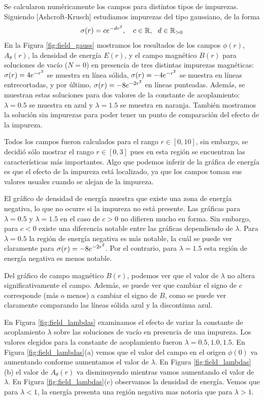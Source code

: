 Se calcularon numéricamente los campos para distintos tipos de impurezas. Siguiendo [Ashcroft-Krusch] estudiamos impurezas del tipo gaussiano, de la forma
\begin{align}
	\sigma(r) = ce^{-dr^2},\ \ \ c\in\mathbb{R}, \ \ d\in\mathbb{R}_{>0}
\end{align}
En la Figura \ref{fig:field_gauss} mostramos los resultados de los campos $\phi(r)$, $A_{\theta}(r)$, la densidad de energía $E(r)$, y el campo magnético $B(r)$ para soluciones de vacío ($N=0$) en presencia de tres distintas impurezas magnéticas: $\sigma(r)=4e^{-r^2}$ se muestra en línea sólida, $\sigma(r)=-4e^{-r^2}$ se muestra en líneas entrecortadas, y por último, $\sigma(r)=-8e^{-2r^2}$ en líneas punteadas. Además, se muestran estas soluciones para dos valores de la constante de acoplamiento: $\lambda=0.5$ se muestra en azul y $\lambda=1.5$ se muestra en naranja. También mostramos la solución sin impurezas para poder tener un punto de comparación del efecto de la impureza.

Todos los campos fueron calculados para el rango $r\in [0,10]$, sin embargo, se decidió sólo mostrar el rango $r\in [0,3]$ pues en esta región se encuentran las características más importantes. Algo que podemos inferir de la gráfica de energía es que el efecto de la impureza está localizado, ya que los campos toman sus valores usuales cuando se alejan de la impureza.

El gráfico de densidad de energía muestra que existe una zona de energía negativa, lo que no ocurre si la impureza no está presente. Las gráficas para $\lambda = 0.5$ y $\lambda = 1.5$ en el caso de $c>0$ no difieren mucho en forma. Sin embargo, para $c<0$ existe una diferencia notable entre las gráficas dependiendo de $\lambda$. Para $\lambda=0.5$ la región de energía negativa es más notable, la cuál se puede ver claramente para $\sigma(r)=-8e^{-2r^2}$. Por el contrario, para $\lambda=1.5$ esta región de energía negativa es menos notable.

Del gráfico de campo magnético $B(r)$, podemos ver que el valor de $\lambda$ no altera significativamente el campo. Además, se puede ver que cambiar el signo de $c$ corresponde (más o menos) a cambiar el signo de $B$, como se puede ver claramente comparando las líneas sólida azul y la discontinua azul.

En Figura \ref{fig:field_lambdas} examinamos el efecto de variar la constante de acoplamiento $\lambda$ sobre las soluciones de vacío en presencia de una impureza. Los valores elegidos para la constante de acoplamiento fueron $\lambda=0.5, 1.0, 1.5$. En Figura \ref{fig:field_lambdas}(a) vemos que el valor del campo en el origen $\phi(0)$ va aumentando conforme aumentamos el valor de $\lambda$. En Figura \ref{fig:field_lambdas}(b) el valor de $A_\theta(r)$ va disminuyendo mientras vamos aumentando el valor de $\lambda$. En Figura \ref{fig:field_lambdas}(c) observamos la densidad de energía. Vemos que para $\lambda<1$, la energía presenta una región negativa mas notoria que para $\lambda>1$.

